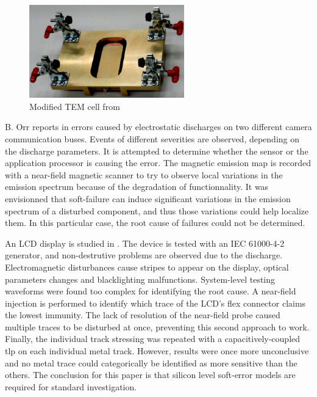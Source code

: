 \begin{figure}[!h]
  \centering
  \includegraphics[width=0.6\textwidth]{src/1/figures/modified_tem_cell.png}
  \caption{Modified TEM cell from \cite{SDRAMCase}}
  \label{fig:modified-tem-cell}
\end{figure}

B. Orr reports in \cite{softFailSubsystem} errors caused by electrostatic discharges on two different camera communication buses.
Events of different severities are observed, depending on the discharge parameters.
It is attempted to determine whether the sensor or the application processor is causing the error.
The magnetic emission map is recorded with a near-field magnetic scanner to try to observe local variations in the emission spectrum because of the degradation of functionnality.
It was envisionned that soft-failure can induce significant variations in the emission spectrum of a disturbed component, and thus those variations could help localize them.
In this particular case, the root cause of failures could not be determined.

An LCD display is studied in \cite{softFailLCD}.
The device is tested with an IEC 61000-4-2 \cite{iec61000-4-2} generator, and non-destrutive problems are observed due to the discharge.
Electromagnetic disturbances cause stripes to appear on the display, optical parameters changes and blacklighting malfunctions.
System-level testing waveforms were found too complex for identifying the root cause.
A near-field injection is performed to identify which trace of the LCD's flex connector claims the lowest immunity.
The lack of resolution of the near-field probe caused multiple traces to be disturbed at once, preventing this second approach to work.
Finally, the individual track stressing was repeated with a capacitively-coupled \gls{tlp} on each individual metal track.
However, results were once more unconclusive and no metal trace could categorically be identified as more sensitive than the others.
The conclusion for this paper is that silicon level soft-error models are required for standard investigation.

